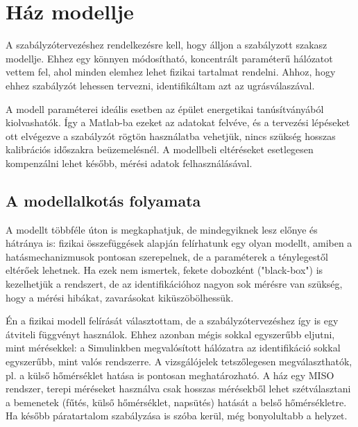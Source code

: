 \chapter{Ház modellje}


A szabályzótervezéshez rendelkezésre kell, hogy álljon a szabályzott szakasz modellje. Ehhez egy könnyen módosítható, koncentrált paraméterű hálózatot vettem fel,
ahol minden elemhez lehet fizikai tartalmat rendelni. Ahhoz, hogy ehhez szabályzót lehessen tervezni, identifikáltam azt az ugrásválaszával. %

A modell paraméterei ideális esetben az épület energetikai tanúsítványából kiolvashatók. Így a Matlab-ba ezeket az adatokat felvéve, és a tervezési lépéseket ott elvégezve a szabályzót rögtön használatba vehetjük, nincs szükség hosszas kalibrációs időszakra beüzemelésnél. A modellbeli eltéréseket esetlegesen kompenzálni lehet később, mérési adatok felhasználásával.%


\section{A modellalkotás folyamata}
%


A modellt többféle úton is megkaphatjuk, de mindegyiknek lesz előnye és hátránya is: fizikai összefüggések alapján felírhatunk egy olyan modellt, amiben a hatásmechanizmusok pontosan szerepelnek, de a paraméterek a ténylegestől eltérőek lehetnek. Ha ezek nem ismertek, fekete dobozként ("black-box") is kezelhetjük a rendszert, de az identifikációhoz nagyon sok mérésre van szükség, hogy a mérési hibákat, zavarásokat kiküszöbölhessük.

Én a fizikai modell felírását választottam, de a szabályzótervezéshez így is egy átviteli függvényt használok. Ehhez azonban mégis sokkal egyszerűbb eljutni, mint mérésekkel:
a Simulinkben megvalósított hálózatra az identifikáció sokkal egyszerűbb, mint valós rendszerre. A vizsgálójelek tetszőlegesen megválaszthatók, pl. a külső hőmérséklet hatása is pontosan meghatározható. A ház egy MISO rendszer, terepi méréseket használva csak hosszas mérésekből lehet szétválasztani a bemenetek (fűtés, külső hőmérséklet, napsütés) hatását a belső hőmérsékletre. Ha később páratartalom szabályzása is szóba kerül, még bonyolultabb a helyzet.


